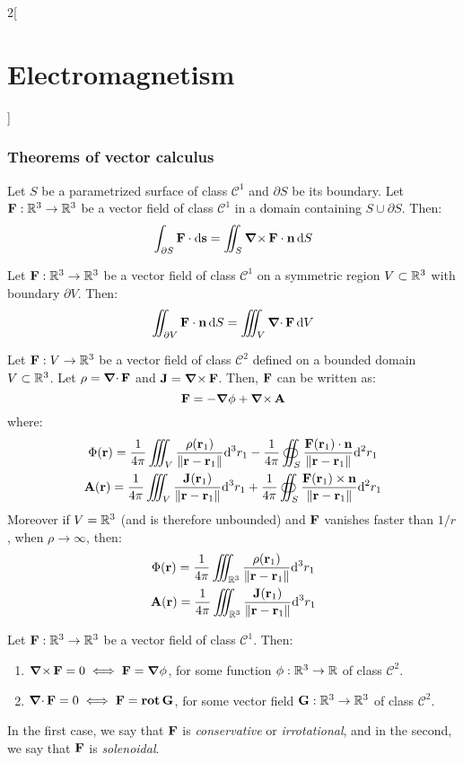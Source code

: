 \documentclass[../../../main.tex]{subfiles}
\begin{document}
\begin{multicols}{2}[\section{Electromagnetism}]
  \subsubsection{Theorems of vector calculus}
  \begin{theorem}
    Let $S$ be a parametrized surface of class $\mathcal{C}^1$ and $\partial S$ be its boundary. Let $\vf{F}:\RR^3\rightarrow\RR^3$ be a vector field of class $\mathcal{C}^1$ in a domain containing $S\cup\partial S$. Then: $$\int_{\partial S}\vf{F}\cdot \dd{\vf{s}}=\iint_S\rotp\vf{F}\cdot\vf{n} \dd{S}$$
  \end{theorem}
  \begin{theorem}
    Let $\vf{F}:\RR^3\rightarrow\RR^3$ be a vector field of class $\mathcal{C}^1$ on a symmetric region $V\subset\RR^3$ with boundary $\partial V$. Then: $$\iint_{\partial V}\vf{F}\cdot\vf{n} \dd{S}=\iiint_V\divp\vf{F}\dd{V}$$
  \end{theorem}
  \begin{theorem}
    Let $\vf{F}:V\rightarrow\RR^3$ be a vector field of class $\mathcal{C}^2$ defined on a bounded domain $V\subset\RR^3$. Let $\rho=\divp\vf{F}$ and $\vf{J}=\rotp\vf{F}$. Then, $\vf{F}$ can be written as: $$\vf{F}=-\grad\phi+\rotp\vf{A}$$
    where:
    \begin{gather*}
      \Phi(\vf{r}) =\frac 1 {4\pi} \iiint_V \frac{\rho(\vf{r}_1)}{\norm{\vf{r}-\vf{r}_1}}\dd^3r_1 -\frac 1 {4\pi} \oiint_S\frac{\vf{F} (\vf{r}_1)\cdot\vf{n}}{\norm{\vf{r}-\vf{r}_1}}\dd^2r_1\\
      \vf{A}(\vf{r}) =\frac 1 {4\pi} \iiint_V \frac{\vf{J}(\vf{r}_1)}{\norm{\vf{r}-\vf{r}_1}}\dd^3r_1 +\frac 1 {4\pi} \oiint_S \frac{\vf{F} (\vf{r}_1)\times\vf{n}}{\norm{\vf{r}-\vf{r}_1}}\dd^2r_1
    \end{gather*}
    Moreover if $V=\RR^3$ (and is therefore unbounded) and $\vf{F}$ vanishes faster than $1/r$, when $\rho\to\infty$, then:
    \begin{gather*}
      \Phi(\vf{r}) =\frac 1 {4\pi} \iiint_{\RR^3} \frac{\rho(\vf{r}_1)}{\norm{\vf{r}-\vf{r}_1}}\dd^3r_1 \\
      \vf{A}(\vf{r}) =\frac 1 {4\pi} \iiint_{\RR^3} \frac{\vf{J}(\vf{r}_1)}{\norm{\vf{r}-\vf{r}_1}}\dd^3r_1
    \end{gather*}
  \end{theorem}
  \begin{theorem}
    Let $\vf{F}:\RR^3\rightarrow\RR^3$ be a vector field of class $\mathcal{C}^1$. Then:
    \begin{enumerate}
      \item $\rotp\vf{F}=0\iff\vf{F}=\grad\phi$, for some function $\phi:\RR^3\rightarrow\RR$ of class $\mathcal{C}^2$.
      \item $\divp\vf{F}=0\iff\vf{F}=\rot\vf{G}$, for some vector field $\vf{G}:\RR^3\rightarrow\RR^3$ of class $\mathcal{C}^2$.
    \end{enumerate}
    In the first case, we say that $\vf{F}$ is \emph{conservative} or \emph{irrotational}, and in the second, we say that $\vf{F}$ is \emph{solenoidal}.
  \end{theorem}

\end{multicols}
\end{document}
